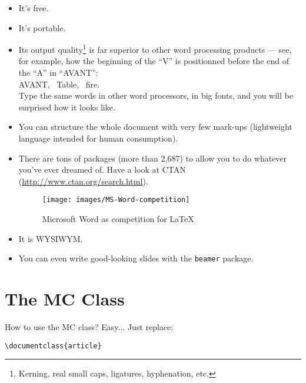 \documentclass{mcreport}
\begin{document}
\begin{itemize}
    \item It's free.

    \item It's portable.

    \item Its output quality\footnote{Kerning, real small caps, ligatures,
    hyphenation, etc.} is far superior to other word processing products ---
    see, for example, how the beginning of the
    ``V'' is positionned before the end of the ``A'' in ``AVANT'': \\
    {\fontsize{40pt}{30pt}\selectfont AVANT},
    {\fontsize{40pt}{30pt}\selectfont ~Table},
    {\fontsize{40pt}{30pt}\selectfont ~fire}. \\
    Type the same words in other word processors, in big fonts, and you will
    be surprised how it looks like.

    \item You can structure the whole document with very few mark-ups
    (lightweight language intended for human consumption).

    \item There are tons of packages (more than 2,687) to allow you to do
    whatever you've ever dreamed of. Have a look at \acs{CTAN}
    (\url{http://www.ctan.org/search.html}).

    \begin{figure}[!ht]
        \centering
        \texttt{[image: images/MS-Word-competition]}
        \caption{Microsoft Word as competition for LaTeX}
        \label{fig:logo-mc}
    \end{figure}

    \item It is \acs{WYSIWYM}.

    \item You can even write good-looking slides with the \texttt{beamer}
    package.
\end{itemize}


\section{The MC Class}
\label{sec:mc-class}

How to use the MC class?  Easy... Just replace:

\begin{verbatim}
\documentclass{article}
\end{verbatim}
\end{document}
